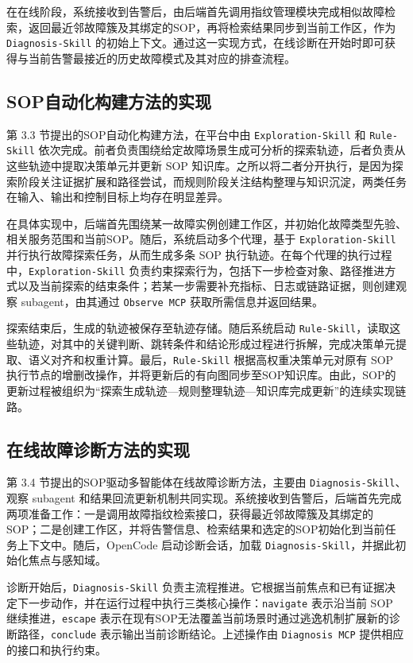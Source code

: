 在在线阶段，系统接收到告警后，由后端首先调用指纹管理模块完成相似故障检索，返回最近邻故障簇及其绑定的SOP，再将检索结果同步到当前工作区，作为 \texttt{Diagnosis-Skill} 的初始上下文。通过这一实现方式，在线诊断在开始时即可获得与当前告警最接近的历史故障模式及其对应的排查流程。

\subsection{SOP自动化构建方法的实现}

第 3.3 节提出的SOP自动化构建方法，在平台中由 \texttt{Exploration-Skill} 和 \texttt{Rule-Skill} 依次完成。前者负责围绕给定故障场景生成可分析的探索轨迹，后者负责从这些轨迹中提取决策单元并更新 SOP 知识库。之所以将二者分开执行，是因为探索阶段关注证据扩展和路径尝试，而规则阶段关注结构整理与知识沉淀，两类任务在输入、输出和控制目标上均存在明显差异。

在具体实现中，后端首先围绕某一故障实例创建工作区，并初始化故障类型先验、相关服务范围和当前SOP。随后，系统启动多个代理，基于 \texttt{Exploration-Skill} 并行执行故障探索任务，从而生成多条 SOP 执行轨迹。在每个代理的执行过程中，\texttt{Exploration-Skill} 负责约束探索行为，包括下一步检查对象、路径推进方式以及当前探索的结束条件；若某一步需要补充指标、日志或链路证据，则创建观察 subagent，由其通过 \texttt{Observe MCP} 获取所需信息并返回结果。

探索结束后，生成的轨迹被保存至轨迹存储。随后系统启动 \texttt{Rule-Skill}，读取这些轨迹，对其中的关键判断、跳转条件和结论形成过程进行拆解，完成决策单元提取、语义对齐和权重计算。最后，\texttt{Rule-Skill} 根据高权重决策单元对原有 SOP 执行节点的增删改操作，并将更新后的有向图同步至SOP知识库。由此，SOP的更新过程被组织为“探索生成轨迹—规则整理轨迹—知识库完成更新”的连续实现链路。

\subsection{在线故障诊断方法的实现}

第 3.4 节提出的SOP驱动多智能体在线故障诊断方法，主要由 \texttt{Diagnosis-Skill}、观察 subagent 和结果回流更新机制共同实现。系统接收到告警后，后端首先完成两项准备工作：一是调用故障指纹检索接口，获得最近邻故障簇及其绑定的SOP；二是创建工作区，并将告警信息、检索结果和选定的SOP初始化到当前任务上下文中。随后，OpenCode 启动诊断会话，加载 \texttt{Diagnosis-Skill}，并据此初始化焦点与感知域。

诊断开始后，\texttt{Diagnosis-Skill} 负责主流程推进。它根据当前焦点和已有证据决定下一步动作，并在运行过程中执行三类核心操作：\texttt{navigate} 表示沿当前 SOP 继续推进，\texttt{escape} 表示在现有SOP无法覆盖当前场景时通过逃逸机制扩展新的诊断路径，\texttt{conclude} 表示输出当前诊断结论。上述操作由 \texttt{Diagnosis MCP} 提供相应的接口和执行约束。

